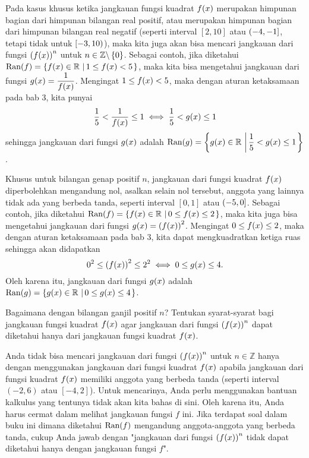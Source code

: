 	\par Pada kasus khusus ketika jangkauan fungsi kuadrat $ \mathop{}\!{f}{\left({x}\right)} $ merupakan himpunan bagian dari himpunan bilangan real positif, atau merupakan himpunan bagian dari himpunan bilangan real negatif (seperti interval $ \left[2, 10\right] $ atau $ \mathop{}\!\left({-4, -1}\right] $, tetapi tidak untuk $ \mathop{}\!\left[{-3, 10}\right) $), maka kita juga akan bisa mencari jangkauan dari fungsi $ \left(\mathop{}\!{f}{\left({x}\right)}\right)^{n} $ untuk $ n \in \mathbb{Z} \backslash \mathop{}\!\left\lbrace0\right\rbrace $. Sebagai contoh, jika diketahui $ \mathop{}\!{\operatorname{Ran}}{\left({f}\right)} = \mathop{}\!\left\lbrace{{\mathop{}\!{f}{\left({x}\right)} \in \mathbb{R}} \, \left|\, {1 \leq \mathop{}\!{f}{\left({x}\right)} < 5}\right.}\right\rbrace $, maka kita bisa mengetahui jangkauan dari fungsi $ \mathop{}\!{g}{\left({x}\right)} = \dfrac{1}{\mathop{}\!{f}{\left({x}\right)}} $. Mengingat $ 1 \leq \mathop{}\!{f}{\left({x}\right)} < 5 $, maka dengan aturan ketaksamaan pada bab 3, kita punyai
	\[ \frac{1}{5} < \frac{1}{\mathop{}\!{f}{\left({x}\right)}} \leq 1 \iff \frac{1}{5} < \mathop{}\!{g}{\left({x}\right)} \leq 1 \]
	sehingga jangkauan dari fungsi $ \mathop{}\!{g}{\left({x}\right)} $ adalah $ \mathop{}\!{\operatorname{Ran}}{\left({g}\right)} = \mathop{}\!\left\lbrace{{\mathop{}\!{g}{\left({x}\right)} \in \mathbb{R}} \, \left|\, {\dfrac{1}{5} < \mathop{}\!{g}{\left({x}\right)} \leq 1}\right.}\right\rbrace $.
	
	\par Khusus untuk bilangan genap positif $ n $, jangkauan dari fungsi kuadrat $ \mathop{}\!{f}{\left({x}\right)} $ diperbolehkan mengandung nol, asalkan selain nol tersebut, anggota yang lainnya tidak ada yang berbeda tanda, seperti interval $ \left[0, 1\right] $ atau $ \mathop{}\!\left({-5, 0}\right] $. Sebagai contoh, jika diketahui $ \mathop{}\!{\operatorname{Ran}}{\left({f}\right)} = \mathop{}\!\left\lbrace{{\mathop{}\!{f}{\left({x}\right)} \in \mathbb{R}} \, \left|\, {0 \leq \mathop{}\!{f}{\left({x}\right)} \leq 2}\right.}\right\rbrace $, maka kita juga bisa mengetahui jangkauan dari fungsi $ \mathop{}\!{g}{\left({x}\right)} = \left(\mathop{}\!{f}{\left({x}\right)}\right)^{2} $. Mengingat $ 0 \leq \mathop{}\!{f}{\left({x}\right)} \leq 2 $, maka dengan aturan ketaksamaan pada bab 3, kita dapat mengkuadratkan ketiga ruas sehingga akan didapatkan
	\[ 0^{2} \leq \left(\mathop{}\!{f}{\left({x}\right)}\right)^{2} \leq 2^{2} \iff 0 \leq \mathop{}\!{g}{\left({x}\right)} \leq 4. \]
	Oleh karena itu, jangkauan dari fungsi $ \mathop{}\!{g}{\left({x}\right)} $ adalah $ \mathop{}\!{\operatorname{Ran}}{\left({g}\right)} = \mathop{}\!\left\lbrace{{\mathop{}\!{g}{\left({x}\right)} \in \mathbb{R}} \, \left|\, {0 \leq \mathop{}\!{g}{\left({x}\right)} \leq 4}\right.}\right\rbrace $.
	
	\begin{explbox}
		Bagaimana dengan bilangan ganjil positif $ n $? Tentukan syarat-syarat bagi jangkauan fungsi kuadrat $ \mathop{}\!{f}{\left({x}\right)} $ agar jangkauan dari fungsi $ \left(\mathop{}\!{f}{\left({x}\right)}\right)^{n} $ dapat diketahui hanya dari jangkauan fungsi kuadrat $ \mathop{}\!{f}{\left({x}\right)} $.
	\end{explbox}
	
	\par Anda tidak bisa mencari jangkauan dari fungsi $ \left(\mathop{}\!{f}{\left({x}\right)}\right)^{n} $ untuk $ n \in \mathbb{Z} $ hanya dengan menggunakan jangkauan dari fungsi kuadrat $ \mathop{}\!{f}{\left({x}\right)} $ apabila jangkauan dari fungsi kuadrat $ \mathop{}\!{f}{\left({x}\right)} $ memiliki anggota yang berbeda tanda (seperti interval $ \left(-2, 6\right) $ atau $ \left[-4, 2\right] $). Untuk mencarinya, Anda perlu menggunakan bantuan kalkulus yang tentunya tidak akan kita bahas di sini. Oleh karena itu, Anda harus cermat dalam melihat jangkauan fungsi $ f $ ini. Jika terdapat soal dalam buku ini dimana diketahui $ \mathop{}\!{\operatorname{Ran}}{\left({f}\right)} $ mengandung anggota-anggota yang berbeda tanda, cukup Anda jawab dengan "jangkauan dari fungsi $ \left(\mathop{}\!{f}{\left({x}\right)}\right)^{n} $ tidak dapat diketahui hanya dengan jangkauan fungsi $ f $".
	
